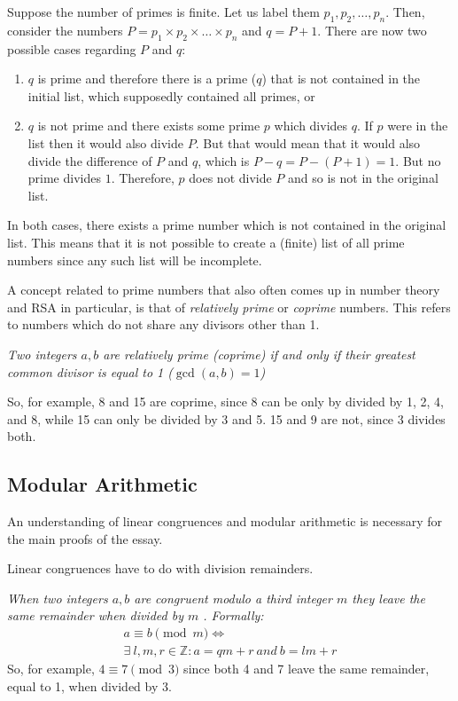 \documentclass[12pt, titlepage]{article}
\begin{document}
Suppose the number of primes is finite. Let us label them $p_1, p_2, \ldots, p_n$. Then,
consider the numbers $P = p_1\times p_2\times \ldots \times p_n$ and $q = P + 1$. There are
now two possible cases regarding $P$ and $q$:
%
\begin{enumerate}[label=\alph*)]
    \item $q$ is prime and therefore there is a prime ($q$) that is not contained in the
        initial list, which supposedly contained all primes, or
    \item $q$ is not prime and there exists some prime $p$ which divides $q$. If $p$
        were in the list then it would also divide $P$. But that would mean that it
        would also divide the difference of $P$ and $q$, which is $P - q = P - (P + 1) =
        1$. But no prime divides $1$.  Therefore, $p$ does not divide $P$ and so is not
        in the original list.
\end{enumerate}
%
In both cases, there exists a prime number which is not contained in the original list.
This means that it is not possible to create a (finite) list of all prime numbers since any
such list will be incomplete.
    
A concept related to prime numbers that also often comes up in number theory and RSA in
particular, is that of \emph{relatively prime} or \emph{coprime} numbers. This refers to
numbers which do not share any divisors other than 1.

\textit{Two integers $a, b$ are relatively prime (coprime) if and only if their greatest common
divisor is equal to 1 ($\gcd(a, b) = 1$)}

So, for example, 8 and 15 are coprime, since 8 can be only by divided by 1, 2, 4, and 8,
while 15 can only be divided by 3 and 5. 15 and 9 are not, since 3 divides both.

\subsection{Modular Arithmetic}

An understanding of linear congruences and modular arithmetic is necessary for the
main proofs of the essay.

Linear congruences have to do with division remainders. 

\textit{When two integers $a, b$ are congruent modulo a third integer $m$ they leave the same
remainder when divided by $m$ \autocite[278]{haese_ib_options}. Formally:}
%
\begin{equation}\label{eq:congr_def_long}
    \begin{gathered}
        a \equiv b \pmod{m} \iff \\
        \exists\ l,m,r \in \mathbb{Z}: a = qm + r\ and\ b = lm + r
    \end{gathered}
\end{equation}
%
So, for example, $4 \equiv 7 \pmod{3}$ since both 4 and 7 leave the same remainder, equal to
1, when divided by 3.
\end{document}
